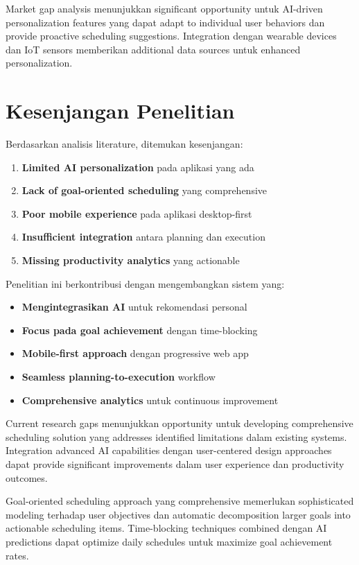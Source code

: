 Market gap analysis menunjukkan significant opportunity untuk AI-driven personalization features yang dapat adapt to individual user behaviors dan provide proactive scheduling suggestions. Integration dengan wearable devices dan IoT sensors memberikan additional data sources untuk enhanced personalization.

\section{Kesenjangan Penelitian}

Berdasarkan analisis literature, ditemukan kesenjangan:

\begin{enumerate}
\item \textbf{Limited AI personalization} pada aplikasi yang ada
\item \textbf{Lack of goal-oriented scheduling} yang comprehensive
\item \textbf{Poor mobile experience} pada aplikasi desktop-first
\item \textbf{Insufficient integration} antara planning dan execution
\item \textbf{Missing productivity analytics} yang actionable
\end{enumerate}

Penelitian ini berkontribusi dengan mengembangkan sistem yang:

\begin{itemize}
\item \textbf{Mengintegrasikan AI} untuk rekomendasi personal
\item \textbf{Focus pada goal achievement} dengan time-blocking
\item \textbf{Mobile-first approach} dengan progressive web app
\item \textbf{Seamless planning-to-execution} workflow
\item \textbf{Comprehensive analytics} untuk continuous improvement
\end{itemize}

Current research gaps menunjukkan opportunity untuk developing comprehensive scheduling solution yang addresses identified limitations dalam existing systems. Integration advanced AI capabilities dengan user-centered design approaches dapat provide significant improvements dalam user experience dan productivity outcomes.

Goal-oriented scheduling approach yang comprehensive memerlukan sophisticated modeling terhadap user objectives dan automatic decomposition larger goals into actionable scheduling items. Time-blocking techniques combined dengan AI predictions dapat optimize daily schedules untuk maximize goal achievement rates.

